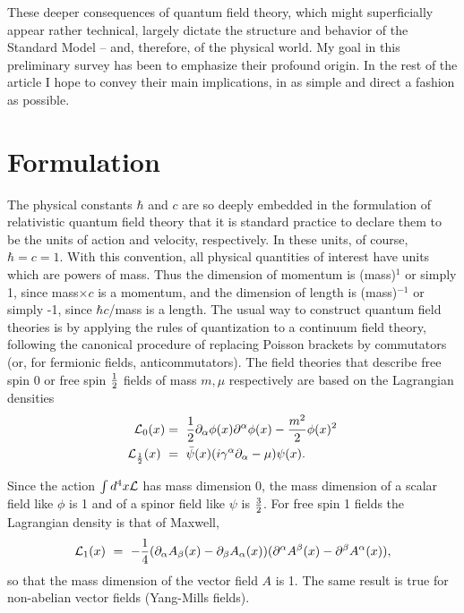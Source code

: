 \documentclass[12pt]{article}
\begin{document}
These deeper consequences of quantum field
theory, which might superficially appear rather technical, largely
dictate the structure and behavior of the Standard Model -- and,
therefore, of the physical world.  My goal in this preliminary survey
has been to emphasize their profound origin.  In the rest of the
article I hope to convey their main implications, in as simple and
direct a fashion as possible.


\section{ Formulation}


The physical constants $\hbar$ and $c$ are so deeply embedded in the
formulation of relativistic quantum field theory that it is standard
practice to declare them to be the units of action and velocity,
respectively.  In these units, of course, $\hbar = c = 1$.   With this
convention,  all physical quantities of interest have units which are
powers of mass.  Thus the dimension of momentum is (mass)$^1$ or
simply 1, since mass$\times c$ is a momentum, and the dimension of
length is  (mass)$^{-1}$ or simply -1, since $\hbar c$/mass is a
length.  The usual way to construct quantum field theories is by
applying the rules of quantization to a continuum field theory,
following the canonical procedure of replacing Poisson brackets by
commutators (or, for fermionic fields, anticommutators).  The field
theories that describe free spin 0 or free spin ${1\over 2}$ fields of
mass $m, \mu$ respectively are based on the Lagrangian
densities
\begin{align}
{\cal L}_0 (x)&=~ {1\over 2} \partial_\alpha
\phi(x) \partial^\alpha \phi(x)  - {m^2\over 2}
\phi(x)^2\label{eq:spinzero}\\
{\cal
L}_{1\over 2}(x) ~&=~ \bar \psi(x) (i \gamma^\alpha \partial_\alpha  -
\mu) \psi(x) .\label{eq:spinhalf}
\end{align}

Since the action $\int
d^4x {\cal L}$ has mass dimension 0, the mass dimension of a scalar
field like $\phi$ is 1 and of a spinor field like $\psi$ is ${3\over
2}$.  For free spin 1 fields the Lagrangian density is that of
Maxwell,
\begin{equation}{\cal L}_1 (x) ~=~ -{1\over 4}
(\partial_\alpha A_\beta (x) - \partial_\beta A_\alpha (x) )
(\partial^\alpha A^\beta (x) - \partial^\beta A^\alpha (x)
),\label{eq:spinone}
\end{equation}
so that the mass dimension of the
vector field $A$ is 1.   The same result is true for non-abelian
vector fields (Yang-Mills fields).  
\end{document}
